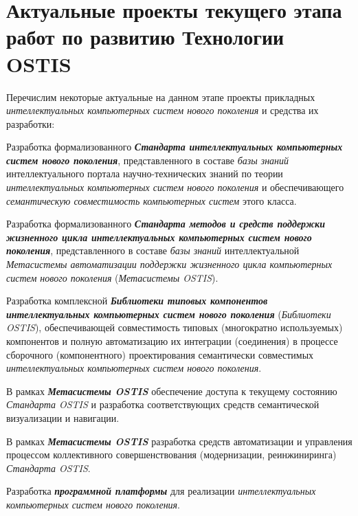 \section*{Актуальные проекты текущего этапа работ по развитию Технологии OSTIS}
\label{concl_actual_projects_current_stage_work_development_technology}

Перечислим некоторые актуальные на данном этапе проекты прикладных \textit{интеллектуальных компьютерных систем нового поколения} и средства их разработки:
\begin{textitemize}
	\item 
	Разработка формализованного \textbf{\textit{Стандарта интеллектуальных компьютерных систем нового поколения}}, представленного в составе \textit{базы знаний} интеллектуального портала научно-технических знаний по теории \textit{интеллектуальных компьютерных систем нового поколения} и обеспечивающего \textit{семантическую совместимость компьютерных систем} этого класса.
	\medskip
	\item 
	Разработка формализованного \textbf{\textit{Стандарта методов и средств поддержки жизненного цикла интеллектуальных компьютерных систем нового поколения}}, представленного в составе \textit{базы знаний} интеллектуальной \textit{Метасистемы автоматизации поддержки жизненного цикла компьютерных систем нового поколения} (\textit{Метасистемы OSTIS}).
	\medskip
	\item 
	Разработка комплексной \textbf{\textit{Библиотеки типовых компонентов интеллектуальных компьютерных систем нового поколения}} (\textit{Библиотеки OSTIS}), обеспечивающей совместимость типовых (многократно используемых) компонентов и полную автоматизацию их интеграции (соединения) в процессе сборочного (компонентного) проектирования семантически совместимых \textit{интеллектуальных компьютерных систем нового поколения}.
	\medskip
	\item 
	В рамках \textbf{\textit{Метасистемы OSTIS}} обеспечение  доступа к текущему состоянию \textit{Стандарта OSTIS} и разработка соответствующих средств семантической визуализации и навигации.
	\medskip
	\item 
	В рамках \textbf{\textit{Метасистемы OSTIS}} разработка средств автоматизации и управления процессом коллективного совершенствования (модернизации, реинжиниринга) \textit{Стандарта OSTIS}.
	\medskip
	\item
	Разработка \textbf{\textit{программной платформы}} для реализации \textit{интеллектуальных компьютерных систем нового поколения}.
	\medskip
	\item 

\end{textitemize}
